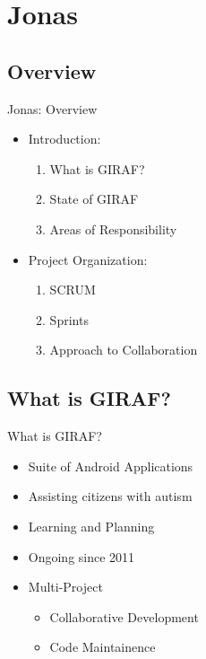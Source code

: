 \section{Jonas}
\subsection{Overview}
\begin{frame}{Jonas: Overview}
\begin{itemize}
	\item Introduction:
  		\begin{enumerate}
			\item What is GIRAF?
			\item State of GIRAF
			\item Areas of Responsibility
		\end{enumerate}
	\item Project Organization:
		\begin{enumerate}
			\item SCRUM
			\item Sprints
			\item Approach to Collaboration
		\end{enumerate}
\end{itemize}
\end{frame}

\subsection{What is GIRAF?}
\begin{frame}{What is GIRAF?}
\begin{itemize}
	\item Suite of Android Applications
	\item Assisting citizens with autism
	\item Learning and Planning
	\item Ongoing since 2011
	\item Multi-Project
		\begin{itemize}
		    \item Collaborative Development 
  			\item Code Maintainence
		\end{itemize}
\end{itemize}
\end{frame}

